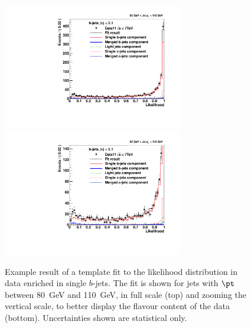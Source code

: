  
\begin{figure}[tp]
\centering
\includegraphics[width=0.7\textwidth]{FIGS/Fits/LikelihoodFit_3param_ETAFull_DataEnriched2btag_Bin2.pdf}
\includegraphics[width=0.7\textwidth]{FIGS/Fits/LikelihoodFit_3param_ETAFull_DataEnriched2btagZOOM_Bin2.pdf}
\caption{Example result of a template fit to the likelihood distribution in data enriched in single $b$-jets. The fit is shown for jets with $\pt$ between  80~GeV and 110~GeV, in full scale (top) and zooming the vertical scale, to better display the flavour content of the data (bottom). Uncertainties shown are statistical only.}
\label{fig:fitenriched2btag1}
\end{figure}





